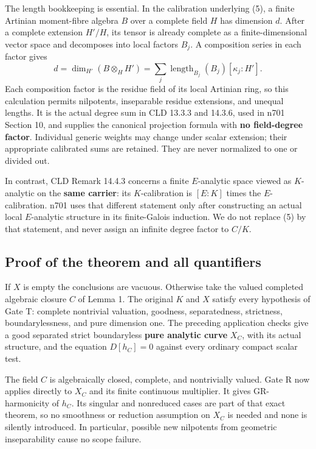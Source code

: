\documentclass[
  11pt,
]{article}
\begin{document}
The length bookkeeping is essential. In the calibration underlying (5),
a finite Artinian moment-fibre algebra \(B\) over a complete field \(H\)
has dimension \(d\). After a complete extension \(H'/H\), its tensor is
already complete as a finite-dimensional vector space and decomposes
into local factors \(B_j\). A composition series in each factor gives \[
 d=\dim_{H'}(B\otimes_H H')
   =\sum_j\operatorname{length}_{B_j}(B_j)[\kappa_j:H'].     \tag{6}
\] Each composition factor is the residue field of its local Artinian
ring, so this calculation permits nilpotents, inseparable residue
extensions, and unequal lengths. It is the actual degree sum in CLD
13.3.3 and 14.3.6, used in n701 Section 10, and supplies the canonical
projection formula with \textbf{no field-degree factor}. Individual
generic weights may change under scalar extension; their appropriate
calibrated sums are retained. They are never normalized to one or
divided out.

In contrast, CLD Remark 14.4.3 concerns a finite \(E\)-analytic space
viewed as \(K\)-analytic on the \textbf{same carrier}: its
\(K\)-calibration is \([E:K]\) times the \(E\)-calibration. n701 uses
that different statement only after constructing an actual local
\(E\)-analytic structure in its finite-Galois induction. We do not
replace (5) by that statement, and never assign an infinite degree
factor to \(C/K\).

\subsection{Proof of the theorem and all
quantifiers}\label{proof-of-the-theorem-and-all-quantifiers}

If \(X\) is empty the conclusions are vacuous. Otherwise take the valued
completed algebraic closure \(C\) of Lemma 1. The original \(K\) and
\(X\) satisfy every hypothesis of Gate T: complete nontrivial valuation,
goodness, separatedness, strictness, boundarylessness, and pure
dimension one. The preceding application checks give a good separated
strict boundaryless \textbf{pure analytic curve} \(X_C\), with its
actual structure, and the equation \(D[h_C]=0\) against every ordinary
compact scalar test.

The field \(C\) is algebraically closed, complete, and nontrivially
valued. Gate R now applies directly to \(X_C\) and its finite continuous
multiplier. It gives GR-harmonicity of \(h_C\). Its singular and
nonreduced cases are part of that exact theorem, so no smoothness or
reduction assumption on \(X_C\) is needed and none is silently
introduced. In particular, possible new nilpotents from geometric
inseparability cause no scope failure.
\end{document}
